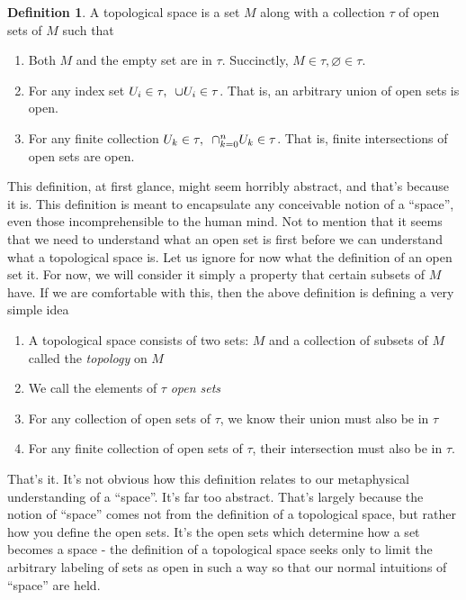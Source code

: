 \documentclass[]{article}
\let\emptyset\varnothing %
\newcommand\<{\ensuremath{\left\langle}}
\renewcommand\>{\ensuremath{\right\rangle}}
\theoremstyle{definition}
\newtheorem{definition}{Definition}[section]
\theoremstyle{definition}
\begin{document}
	\begin{definition}
		A topological space is a set $M$ along with a collection $\tau$ of open sets of $M$ such that
		\begin{enumerate}[1.]
				\item Both $M$ and the empty set are in $\tau$. Succinctly, $M \in \tau, \emptyset \in \tau$.
				\item For any index set $U_i \in \tau, \hspace*{5px}\cup U_i \in \tau$. That is, an arbitrary union of open sets is open.
				\item For any finite collection $U_k \in \tau, \hspace*{5px}\cap^n_{k=0} U_k \in \tau$. That is, finite intersections of open sets are open.
		\end{enumerate}
	\end{definition}
	This definition, at first glance, might seem horribly abstract, and that's because it is. This definition is meant to encapsulate any conceivable notion of a ``space'', even those incomprehensible to the human mind. Not to mention that it seems that we need to understand what an open set is first before we can understand what a topological space is. Let us ignore for now what the definition of an open set it. For now, we will consider it simply a property that certain subsets of $M$ have. If we are comfortable with this, then the above definition is defining a very simple idea
	\begin{enumerate}[1.]
		\item A topological space consists of two sets: $M$ and a collection of subsets of $M$ called the \textit{topology} on $M$
		\item We call the elements of $\tau$ \textit{open sets}
		\item For any collection of open sets of $\tau$, we know their union must also be in $\tau$
		\item For any finite collection of open sets of $\tau$, their intersection must also be in $\tau$.
	\end{enumerate}
	That's it. It's not obvious how this definition relates to our metaphysical understanding of a ``space''. It's far too abstract. That's largely because the notion of ``space'' comes not from the definition of a topological space, but rather how you define the open sets. It's the open sets which determine how a set becomes a space - the definition of a topological space seeks only to limit the arbitrary labeling of sets as open in such a way so that our normal intuitions of ``space'' are held.\\
\end{document}

